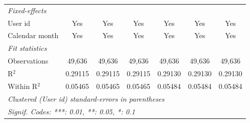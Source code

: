 \begin{table}[htbp]
\begin{footnotesize}
\begin{tabular}{lcccccc}
         \midrule \emph{Fixed-effects} &   &   &   &   &   &  \\
         User id             & Yes            & Yes            & Yes            & Yes            & Yes            & Yes\\
         Calendar month      & Yes            & Yes            & Yes            & Yes            & Yes            & Yes\\
         \midrule \emph{Fit statistics} &   &   &   &   &   &  \\
         Observations        & 49,636         & 49,636         & 49,636         & 49,636         & 49,636         & 49,636\\
         R$^2$               & 0.29115        & 0.29115        & 0.29115        & 0.29130        & 0.29130        & 0.29130\\
         Within R$^2$        & 0.05465        & 0.05465        & 0.05465        & 0.05484        & 0.05484        & 0.05484\\
         \midrule\midrule\multicolumn{7}{l}{\emph{Clustered (User id) standard-errors in parentheses}}\\
         \multicolumn{7}{l}{\emph{Signif. Codes: ***: 0.01, **: 0.05, *: 0.1}}\\
      \end{tabular}
   \end{footnotesize}
\end{table}


